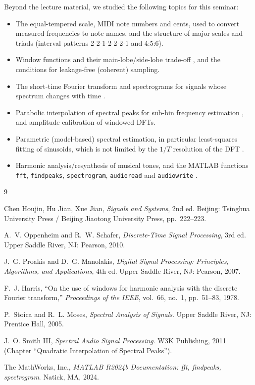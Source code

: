 \documentclass[12pt, a4paper]{article}
\begin{document}
Beyond the lecture material, we studied the following topics for this seminar:
\begin{itemize}
    \item The equal-tempered scale, MIDI note numbers and cents, used to convert measured frequencies to note names, and the structure of major scales and triads (interval patterns 2-2-1-2-2-2-1 and 4:5:6).
    \item Window functions and their main-lobe/side-lobe trade-off \cite{harris}, and the conditions for leakage-free (coherent) sampling.
    \item The short-time Fourier transform and spectrograms for signals whose spectrum changes with time \cite{oppenheim}.
    \item Parabolic interpolation of spectral peaks for sub-bin frequency estimation \cite{smith}, and amplitude calibration of windowed DFTs.
    \item Parametric (model-based) spectral estimation, in particular least-squares fitting of sinusoids, which is not limited by the $1/T$ resolution of the DFT \cite{stoica}.
    \item Harmonic analysis/resynthesis of musical tones, and the MATLAB functions \texttt{fft}, \texttt{findpeaks}, \texttt{spectrogram}, \texttt{audioread} and \texttt{audiowrite} \cite{matlab}.
\end{itemize}

\begin{thebibliography}{9}

 Chen Houjin, Hu Jian, Xue Jian, \emph{Signals and Systems}, 2nd ed. Beijing: Tsinghua University Press / Beijing Jiaotong University Press, pp.~222--223.

 A.~V. Oppenheim and R.~W. Schafer, \emph{Discrete-Time Signal Processing}, 3rd ed. Upper Saddle River, NJ: Pearson, 2010.

 J.~G. Proakis and D.~G. Manolakis, \emph{Digital Signal Processing: Principles, Algorithms, and Applications}, 4th ed. Upper Saddle River, NJ: Pearson, 2007.

 F.~J. Harris, ``On the use of windows for harmonic analysis with the discrete Fourier transform,'' \emph{Proceedings of the IEEE}, vol.~66, no.~1, pp.~51--83, 1978.

 P.~Stoica and R.~L. Moses, \emph{Spectral Analysis of Signals}. Upper Saddle River, NJ: Prentice Hall, 2005.

 J.~O. Smith III, \emph{Spectral Audio Signal Processing}. W3K Publishing, 2011 (Chapter ``Quadratic Interpolation of Spectral Peaks'').

 The MathWorks, Inc., \emph{MATLAB R2024b Documentation: fft, findpeaks, spectrogram}. Natick, MA, 2024.

\end{thebibliography}
\end{document}
